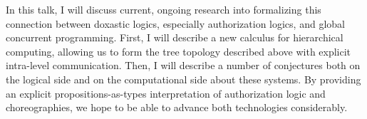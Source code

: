 In this talk, I will discuss current, ongoing research into formalizing this connection between doxastic logics, especially authorization logics, and global concurrent programming.
First, I will describe a new calculus for hierarchical computing, allowing us to form the tree topology described above with explicit intra-level communication.
Then, I will describe a number of conjectures both on the logical side and on the computational side about these systems.
By providing an explicit propositions-as-types interpretation of authorization logic and choreographies, we hope to be able to advance both technologies considerably.

